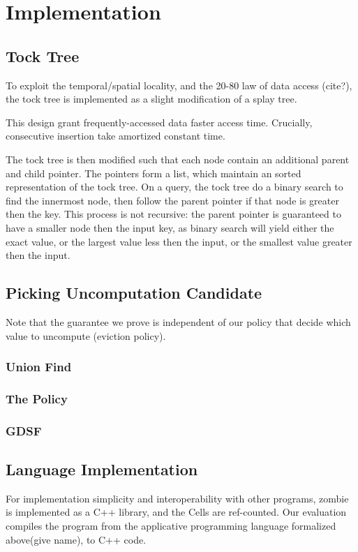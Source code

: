 \documentclass[acmsmall]{acmart}
\begin{document}
	\section{Implementation}
	\subsection{Tock Tree}
	To exploit the temporal/spatial locality, and the 20-80 law of data access (cite?), the tock tree is implemented as a slight modification of a splay tree.

	This design grant frequently-accessed data faster access time. Crucially, consecutive insertion take amortized constant time.
	
	The tock tree is then modified such that each node contain an additional parent and child pointer. The pointers form a list, which maintain an sorted representation of the tock tree. On a query, the tock tree do a binary search to find the innermost node, then follow the parent pointer if that node is greater then the key. This process is not recursive: the parent pointer is guaranteed to have a smaller node then the input key, as binary search will yield either the exact value, or the largest value less then the input, or the smallest value greater then the input.
	\subsection{Picking Uncomputation Candidate}
	Note that the guarantee we prove is independent of our policy that decide which value to uncompute (eviction policy).
	\subsubsection{Union Find}
	\subsubsection{The Policy}
	\subsubsection{GDSF}
	\subsection{Language Implementation}
	For implementation simplicity and interoperability with other programs, zombie is implemented as a C++ library, and the Cells are ref-counted. Our evaluation compiles the program from the applicative programming language formalized above(give name), to C++ code.
\end{document}
